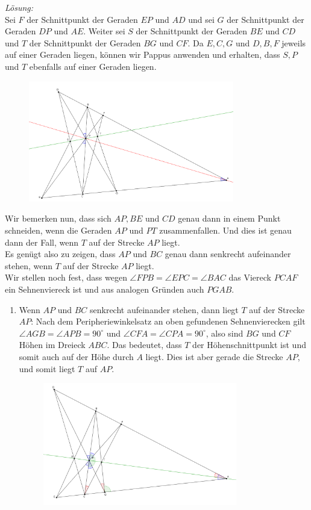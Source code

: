 \documentclass[12pt,a4paper]{article}
\theoremstyle{plain}
\theoremstyle{definition}
\theoremstyle{remark}
\begin{document}
\begin{enumerate}
\textit{Lösung:}\\
 Sei $F$ der Schnittpunkt der Geraden $EP$ und $AD$ und sei $G$ der Schnittpunkt der Geraden $DP$ und $AE$. Weiter sei $S$ der Schnittpunkt der Geraden $BE$ und $CD$ und $T$ der Schnittpunkt der Geraden $BG$ und $CF$. Da $E,C,G$ und $D,B,F$ jeweils auf einer Geraden liegen, können wir Pappus anwenden und erhalten, dass $S,P$ und $T$ ebenfalls auf einer Geraden liegen.\\
\begin{figure}[h]
\centering \includegraphics[width=0.80\textwidth]{Senkrecht1}
\end{figure}
Wir bemerken nun, dass sich $AP,BE$ und $CD$ genau dann in einem Punkt schneiden, wenn die Geraden $AP$ und $PT$ zusammenfallen. Und dies ist genau dann der Fall, wenn $T$ auf der Strecke $AP$ liegt.\\
Es genügt also zu zeigen, dass $AP$ und $BC$ genau dann senkrecht aufeinander stehen, wenn $T$ auf der Strecke $AP$ liegt.\\
Wir stellen noch fest, dass wegen $\angle FPB=\angle EPC=\angle BAC$ das Viereck $PCAF$ ein Sehnenviereck ist und aus analogen Gründen auch $PGAB$.\\
\begin{enumerate}
\item Wenn $AP$ und $BC$ senkrecht aufeinander stehen, dann liegt $T$ auf der Strecke $AP$: Nach dem Peripheriewinkelsatz an oben gefundenen Sehnenvierecken gilt $\angle AGB=\angle APB=90^\circ$ und $\angle CFA=\angle CPA=90^\circ$, also sind $BG$ und $CF$ Höhen im Dreieck $ABC$. Das bedeutet, dass $T$ der Höhenschnittpunkt ist und somit auch auf der Höhe durch $A$ liegt. Dies ist aber gerade die Strecke $AP$, und somit liegt $T$ auf $AP$.\\
\begin{figure}[h]
\centering \includegraphics[width=0.80\textwidth]{Senkrecht2}

\end{figure}
\end{enumerate}
\end{enumerate}
\end{document}
